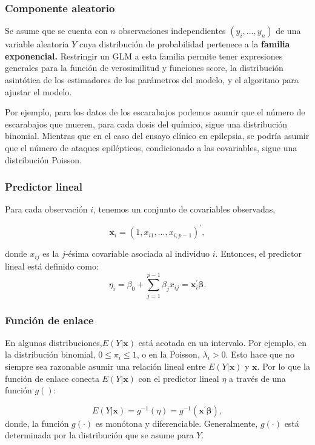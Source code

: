 \documentclass[
]{article}
\begin{document}
\subsubsection{Componente aleatorio}\label{componente-aleatorio}

Se asume que se cuenta con \(n\) observaciones independientes \((y_{i},...,y_{n})\) de una variable aleatoria \(Y\) cuya distribución de probabilidad pertenece a la \textbf{familia exponencial.} Restringir un GLM a esta familia permite tener expresiones generales para la función de verosimilitud y funciones score, la distribución asintótica de los estimadores de los parámetros del modelo, y el algoritmo para ajustar el modelo.

Por ejemplo, para los datos de los escarabajos podemos asumir que el número de escarabajos que mueren, para cada dosis del químico, sigue una distribución binomial. Mientras que en el caso del ensayo clínico en epilepsia, se podría asumir que el número de ataques epilépticos, condicionado a las covariables, sigue una distribución Poisson.

\subsubsection{Predictor lineal}\label{predictor-lineal}

Para cada observación \(i\), tenemos un conjunto de covariables observadas,

\[
\boldsymbol x_{i}=(1,x_{i1},...,x_{i,p-1})^{'},
\]

donde \(x_{ij}\) es la \(j\)-ésima covariable asociada al individuo \(i\). Entonces, el predictor lineal está definido como:
\[
\eta_{i}=\beta_{0}+\sum_{j=1}^{p-1}\beta_{j}x_{ij}=\boldsymbol x_{i}^{'}\boldsymbol \beta.
\]

\subsubsection{Función de enlace}\label{funciuxf3n-de-enlace}

En algunas distribuciones,\(E(Y|\boldsymbol x)\) está acotada en un intervalo. Por ejemplo, en la distribución binomial, \(0\leq \pi_{i}\leq 1\), o en la Poisson, \(\lambda_{i}>0\). Esto hace que no siempre sea razonable asumir una relación lineal entre \(E(Y | \boldsymbol x)\) y \(\boldsymbol x\). Por lo que la función de enlace conecta \(E(Y|\boldsymbol x)\) con el predictor lineal \(\eta\) a través de una función \(g()\):

\[
E(Y|\boldsymbol x)=g^{-1}(\eta)=g^{-1}(\boldsymbol x^{'}\boldsymbol \beta),
\]
donde, la función \(g(\cdot)\) es monótona y diferenciable. Generalmente, \(g(\cdot)\) está determinada por la distribución que se asume para \(Y\).
\end{document}
